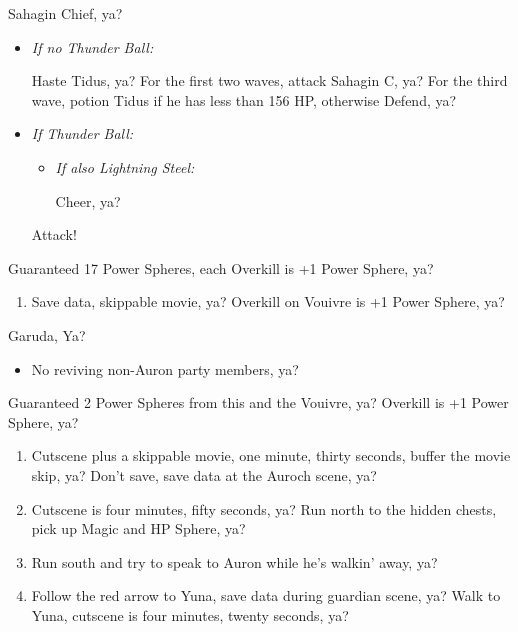 \begin{battle}{Sahagin Chief, ya?}
    \begin{itemize}
        \item \textit{If no Thunder Ball:}
        \begin{itemize}
            \tidusf Haste Tidus, ya?
            \wakkaf For the first two waves, attack Sahagin C, ya?
            \wakkaf For the third wave, potion Tidus if he has less than 156 HP, otherwise Defend, ya?
        \end{itemize}
        \item \textit{If Thunder Ball:}
        \begin{itemize}
            \tidusf Cheer, ya?
            \wakkaf Attack, ya?
            \tidusf Haste Tidus, ya?
            \tidusf Haste Wakka, ya?
            \item \textit{If also Lightning Steel:}
            \begin{itemize}
                \tidusf Cheer, ya?
            \end{itemize}
        \end{itemize}
        \tidusf Attack!
    \end{itemize}
    Guaranteed 17 Power Spheres, each Overkill is +1 Power Sphere, ya?
\end{battle}
\begin{enumerate}[resume]
    \item Save data, skippable movie, ya? Overkill on Vouivre is +1 Power Sphere, ya?
\end{enumerate}
\begin{battle}[1800]{Garuda, Ya?}
    \begin{itemize}
        \tidusf Haste Auron, ya?
        \auronf Attack x3, show that bird what for!
        \wakkaf Defend, Potion if Tidus has less than 312 HP, gotta keep him healthy!
        \tidusf Attack x1, then Defend, ya?
        \wakkaf Defend, Potion if Auron has less than 202 HP, ya?
        \auronf Attack x3, ya?
        \item No reviving non-Auron party members, ya?
    \end{itemize}
    Guaranteed 2 Power Spheres from this and the Vouivre, ya? Overkill is +1 Power Sphere, ya?
\end{battle}
\begin{enumerate}[resume]
    \item Cutscene plus a skippable movie, one minute, thirty seconds, buffer the movie skip, ya? Don't save, save data at the Auroch scene, ya?
    \item Cutscene is four minutes, fifty seconds, ya? Run north to the hidden chests, pick up Magic and HP Sphere, ya?
    \item Run south and try to speak to Auron while he's walkin' away, ya?
    \item Follow the red arrow to Yuna, save data during guardian scene, ya? Walk to Yuna, cutscene is four minutes, twenty seconds, ya?
\end{enumerate}